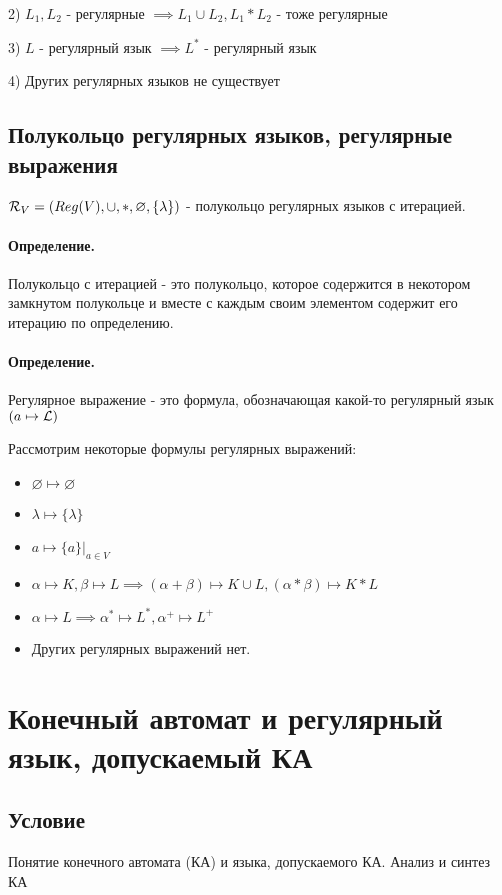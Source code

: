 \documentclass{report}
\begin{document}
2) $L_1,L_2$ - регулярные $\implies L_1 \cup L_2, L_1*L_2$ - тоже регулярные

3) $L$ - регулярный язык  $\implies L^{*}$ - регулярный язык

4) Других регулярных языков не существует

\subsection{Полукольцо регулярных языков, регулярные выражения}
$ {\cal R}_{V} = (Reg(V), \cup, *, \varnothing, \{\lambda\} )$ - полукольцо
регулярных языков с итерацией.

\paragraph*{Определение.}
Полукольцо с итерацией - это полукольцо, которое содержится в некотором замкнутом
полукольце и вместе с каждым своим элементом содержит его итерацию по определению.



\paragraph*{Определение.}
Регулярное выражение - это формула, обозначающая какой-то регулярный язык $(a \mapsto  {\cal L})$ 

Рассмотрим некоторые формулы регулярных выражений:
\begin{itemize}
	\item $\varnothing \mapsto \varnothing$
	\item $\lambda \mapsto \{\lambda\} $
 	\item $a \mapsto \{a\}|_{a \in V} $ 
	\item $\alpha \mapsto K, \beta \mapsto L \implies
		(\alpha + \beta) \mapsto K \cup L, (\alpha * \beta) \mapsto K*L$
	\item $\alpha \mapsto L \implies \alpha^{*} \mapsto L^{*},
		\alpha^{+} \mapsto L^{+}$ 
	\item Других регулярных выражений нет.
\end{itemize}

\newpage

\section{Конечный автомат и регулярный язык, допускаемый КА}
\subsection{Условие}
Понятие конечного автомата (КА) и языка, допускаемого КА. Анализ и синтез КА
\end{document}

